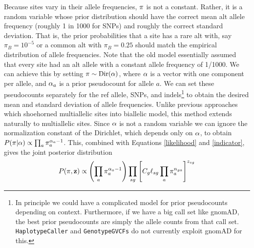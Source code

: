 \documentclass[nofootinbib,amssymb,amsmath]{revtex4}
\newcommand{\vz}{{\bf z}}
\newcommand{\vpi}{{\bf \pi}}
\newcommand{\valpha}{{\bf \alpha}}
\newcommand{\code}[1]{\texttt{#1}}
\begin{document}
Because sites vary in their allele frequencies, $\vpi$ is not a constant.  Rather, it is a random variable whose prior distribution should have the correct mean alt allele frequency (roughly 1 in 1000 for SNPs) and roughly the correct standard deviation.  That is, the prior probabilities that a site has a rare alt with, say $\pi_B = 10^{-5}$ or a common alt with $\pi_B = 0.25$ should match the empirical distribution of allele frequencies.  Note that the old model essentially assumed that every site had an alt allele with a constant allele frequency of 1/1000.  We can achieve this by setting $\vpi \sim {\rm Dir}(\valpha)$, where $\valpha$ is a vector with one component per allele, and $\valpha_a$ is a prior pseudocount for allele $a$.  We can set these pseudocounts separately for the ref allele, SNPs, and indels\footnote{In principle we could have a complicated model for prior pseudocounts depending on context.  Furthermore, if we have a big call set like gnomAD, the best prior pseudocounts are simply the allele counts from that call set.  \code{HaplotypeCaller} and \code{GenotypeGVCFs} do not currently exploit gnomAD for this.} to obtain the desired mean and standard deviation of allele frequencies.  Unlike previous approaches which shoehorned multiallelic sites into  biallelic model, this method extends naturally to multiallelic sites.  Since $\valpha$ is not a random variable we can ignore the normalization constant of the Dirichlet, which depends only on $\valpha$, to obtain $P(\vpi | \valpha) \propto  \prod_a \pi_a^{\alpha_a - 1}$.  This, combined with Equations \ref{likelihood} and \ref{indicator}, gives the joint posterior distribution
\begin{equation}
P(\vpi, \vz) \propto \left( \prod_a \pi_a^{\alpha_a - 1} \right) \prod_{sg} \left[ C_g \ell_{sg} \prod_a \pi_a^{n_{ga}} \right]^{z_{sg}}
\label{joint-posterior}
\end{equation}
\end{document}
